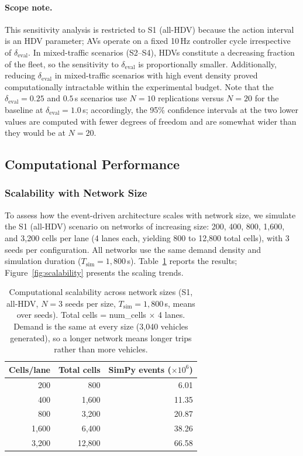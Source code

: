 \documentclass[review,authoryear]{elsarticle}
\begin{document}
\paragraph{Scope note.} This sensitivity analysis is restricted to S1 (all-HDV) because the action interval is an HDV parameter; AVs operate on a fixed 10\,Hz controller cycle irrespective of $\delta_{\text{eval}}$. In mixed-traffic scenarios (S2--S4), HDVs constitute a decreasing fraction of the fleet, so the sensitivity to $\delta_{\text{eval}}$ is proportionally smaller. Additionally, reducing $\delta_{\text{eval}}$ in mixed-traffic scenarios with high event density proved computationally intractable within the experimental budget. Note that the $\delta_{\text{eval}} = 0.25$ and $0.5$\,s scenarios use $N = 10$ replications versus $N = 20$ for the baseline at $\delta_{\text{eval}} = 1.0$\,s; accordingly, the 95\% confidence intervals at the two lower values are computed with fewer degrees of freedom and are somewhat wider than they would be at $N = 20$.


\subsection{Computational Performance}
\label{sec:exp_performance_new}

\subsubsection{Scalability with Network Size}
\label{sec:exp_scalability}

To assess how the event-driven architecture scales with network size, we simulate the S1 (all-HDV) scenario on networks of increasing size: 200, 400, 800, 1{,}600, and 3{,}200 cells per lane (4 lanes each, yielding 800 to 12{,}800 total cells), with 3 seeds per configuration. All networks use the same demand density and simulation duration ($T_{\text{sim}} = 1{,}800$\,s). Table~\ref{tab:scalability} reports the results; Figure~\ref{fig:scalability} presents the scaling trends.

\begin{table}[ht]
\centering
\caption{Computational scalability across network sizes (S1, all-HDV, $N = 3$ seeds per size, $T_{\text{sim}} = 1{,}800$\,s, means over seeds). Total cells = num\_cells $\times$ 4 lanes. Demand is the same at every size (3{,}040 vehicles generated), so a longer network means longer trips rather than more vehicles.}
\label{tab:scalability}
\begin{tabular}{@{}rrr@{}}
\toprule
Cells/lane & Total cells & SimPy events ($\times 10^6$) \\
\midrule
200 & 800 & 6.01 \\
400 & 1{,}600 & 11.35 \\
800 & 3{,}200 & 20.87 \\
1{,}600 & 6{,}400 & 38.26 \\
3{,}200 & 12{,}800 & 66.58 \\
\bottomrule
\end{tabular}
\end{table}
\end{document}
